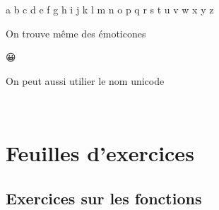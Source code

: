 \documentclass[letterpaper,10pt,english]{sphinxhowto}
\begin{document}
\begin{sphinxVerbatim}[commandchars=\\\{\}]
\PYG{p}{[}      \PYG{p}{]}
\end{sphinxVerbatim}

\begin{sphinxVerbatim}[commandchars=\\\{\}]
\PYGZsq{}a b c d e f g h i j k l m n o p q r s t u v w x y z\PYGZsq{}
\end{sphinxVerbatim}

\sphinxAtStartPar
On trouve même des émoticones

\begin{sphinxVerbatim}[commandchars=\\\{\}]
  
\end{sphinxVerbatim}

\begin{sphinxVerbatim}[commandchars=\\\{\}]
😀
\end{sphinxVerbatim}

\sphinxAtStartPar
On peut aussi utilier le nom unicode

\begin{sphinxVerbatim}[commandchars=\\\{\}]
\end{sphinxVerbatim}

\begin{sphinxVerbatim}[commandchars=\\\{\}]
🙂
\end{sphinxVerbatim}


\section{Feuilles d’exercices}
\label{\detokenize{feuilles_d_exercices:feuilles-d-exercices}}\label{\detokenize{feuilles_d_exercices::doc}}

\subsection{Exercices sur les fonctions}
\label{\detokenize{cours1_fonctions_exercices:exercices-sur-les-fonctions}}\label{\detokenize{cours1_fonctions_exercices::doc}}
\end{document}

